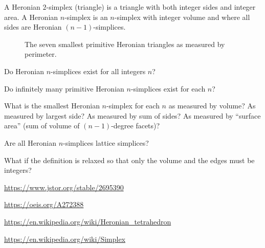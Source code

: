 \documentclass{article}
\begin{document}
A Heronian $2$-simplex (triangle) is a triangle with both integer sides and
integer area. A Heronian $n$-simplex is an $n$-simplex with integer volume and
where all sides are Heronian $(n - 1)$-simplices.
\begin{figure}[ht!]
  \centering
  \begin{tikzpicture}
  \end{tikzpicture}
  \begin{tikzpicture}
  \end{tikzpicture}
  \caption{
    The seven smallest primitive Heronian triangles as measured by perimeter.
  }
\end{figure}
\begin{question}
  Do Heronian $n$-simplices exist for all integers $n$?
\end{question}

\begin{related}
  \item Do infinitely many primitive Heronian $n$-simplices exist for each $n$?
  \item What is the smallest Heronian $n$-simplex for each $n$ as measured by
    volume? As measured by largest side? As measured by sum of sides?
    As measured by ``surface area'' (sum of volume of $(n-1)$-degree facets)?
  \item Are all Heronian $n$-simplices lattice simplices?
  \item What if the definition is relaxed so that only the volume and the
    edges must be integers?
\end{related}
\begin{references}
  \item \url{https://www.jstor.org/stable/2695390}
  \item \url{https://oeis.org/A272388}
  \item \url{https://en.wikipedia.org/wiki/Heronian_tetrahedron}
  \item \url{https://en.wikipedia.org/wiki/Simplex}
\end{references}
\end{document}
